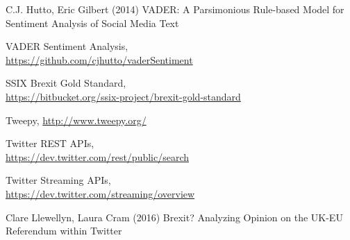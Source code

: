 \documentclass{emulateapj}
\begin{document}
\begin{thebibliography}{9}
   C.J. Hutto, Eric Gilbert (2014) VADER: A Parsimonious Rule-based Model for Sentiment Analysis of Social Media Text

   VADER Sentiment Analysis, \\ 
    \url{https://github.com/cjhutto/vaderSentiment}

   SSIX Brexit Gold Standard, \\
    \url{https://bitbucket.org/ssix-project/brexit-gold-standard}

   Tweepy, \url{http://www.tweepy.org/}

   Twitter REST APIs, \\
    \url{https://dev.twitter.com/rest/public/search}

   Twitter Streaming APIs, \\ 
    \url{https://dev.twitter.com/streaming/overview}

   Clare Llewellyn, Laura Cram (2016) Brexit? Analyzing Opinion on the UK-EU Referendum within Twitter
\end{thebibliography}
\end{document}
